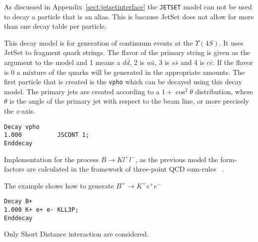 \Notes
As discussed in Appendix~\ref{sect:jetsetinterface} the {\tt JETSET}
model can not be used to decay a particle that is an alias. This is 
bacause JetSet does not allow for more than one decay table per
particle.






\Expl
This decay model is for generation of continuum events at the 
$\Upsilon(4S)$. It uses JetSet to fragment quark strings. The
flavor of the primary string is given as the argument to the
model and 1 means a $d\bar d$, 2 is $u\bar u$, 3 is $s\bar s$ and
4 is $c\bar c$. If the flavor is 0 a mixture of the quarks will
be generated in the appropriate amounts. 
The first particle that is created is the {\tt vpho} which can be
decayed using this decay model.
The primary jets are created according to a $1+\cos^2\theta$
distribution, where $\theta$ is the angle of the primary jet
with respect to the beam line, or more precisely the $z$-axis.

\Example
\begin{verbatim}
Decay vpho
1.000          JSCONT 1;
Enddecay
\end{verbatim}





\label{KLL3P}



\Expl
Implementation for the process $B\rightarrow K l^+ l^-$, as the previous model
the form-factors are calculated in the framework of three-point QCD sum-rules ~\cite{Colangelo96}.
 
\Example
The example shows how to generate $B^+\rightarrow K^{+} e^+ e^-$
\begin{verbatim}
Decay B+
1.000 K+ e+ e- KLL3P;
Enddecay
\end{verbatim}

\Notes
Only Short Distance interaction are considered.







%
%
%
%
%
%
%
%

